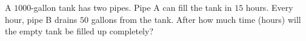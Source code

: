 A $1000$-gallon tank has two pipes. Pipe A can fill the tank in $15$ hours. Every hour, pipe B drains $50$ gallons from the tank. After how much time (hours) will the empty tank be filled up completely?
